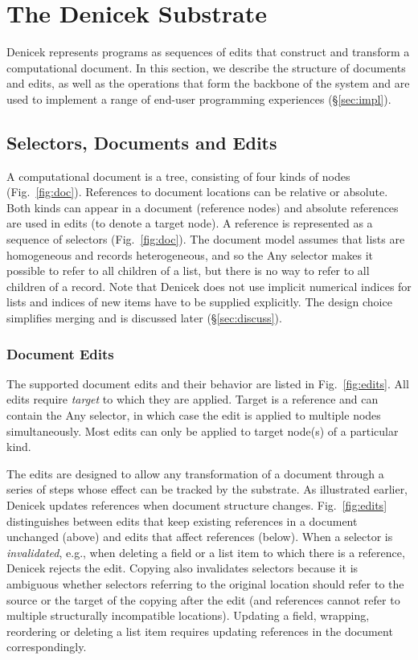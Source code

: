 \documentclass[sigconf,anonymous,screen]{acmart}
\newcommand{\ident}[1]{{\sffamily #1}}
\begin{document}

\section{The Denicek Substrate}
\label{sec:system}
Denicek represents programs as sequences of edits that construct and transform a computational
document. In this section, we describe the structure of documents and edits, as well as the
operations that form the backbone of the system and are used to implement a range of
end-user programming experiences (\S\ref{sec:impl}).

\subsection{Selectors, Documents and Edits}
A computational document is a tree, consisting of four kinds of nodes (Fig.~\ref{fig:doc}).
References to document locations can be relative or absolute. Both kinds can appear in a
document (reference nodes) and absolute references are used in edits (to denote a target node).
A reference is represented as a sequence of selectors (Fig.~\ref{fig:doc}).
The document model assumes that lists are homogeneous and records heterogeneous, and so the
\ident{Any} selector makes it possible to refer to all children of a list, but there is no
way to refer to all children of a record.
%
Note that Denicek does not use implicit numerical indices for lists and indices of new items have
to be supplied explicitly. The design choice simplifies merging and is discussed later
(\S\ref{sec:discuss}).


\subsubsection*{Document Edits}
The supported document edits and their behavior are listed in Fig.~\ref{fig:edits}. All edits
require \emph{target} to which they are applied. Target is a reference and can contain the
\ident{Any} selector, in which case the edit is applied to multiple nodes simultaneously.
Most edits can only be applied to target node(s) of a particular kind.

The edits are designed to allow any transformation of a document
through a series of steps whose effect can be tracked by the substrate. As illustrated earlier,
Denicek updates references when document structure changes. Fig.~\ref{fig:edits} distinguishes
between edits that keep existing references in a document unchanged (above) and edits that affect
references (below). When a selector is \emph{invalidated}, e.g., when deleting a field or a
list item to which there is a reference, Denicek rejects the edit. Copying also invalidates
selectors because it is ambiguous whether selectors referring to the original location should
refer to the source or the target of the copying after the edit (and references cannot refer to
multiple structurally incompatible locations). Updating a field, wrapping, reordering or deleting
a list item requires updating references in the document correspondingly.
\end{document}
